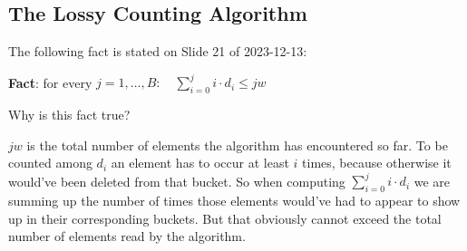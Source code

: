 \documentclass{article}
\begin{document}
  \subsection{The Lossy Counting Algorithm}
  \begin{centerframebox}
    The following fact is stated on Slide 21 of 2023-12-13:

    \textbf{Fact}: for every $j = 1,\dots,B: \quad \sum_{i=0}^j i \cdot d_i \leq jw$

    Why is this fact true?
  \end{centerframebox}
  $jw$ is the total number of elements the algorithm has encountered so far.
  To be counted among $d_i$ an element has to occur at least $i$ times,
  because otherwise it would've been deleted from that bucket.
  So when computing $\sum_{i=0}^j i \cdot d_i$
  we are summing up the number of times those elements would've had to appear to show up in their corresponding buckets.
  But that obviously cannot exceed the total number of elements read by the algorithm.
\end{document}
